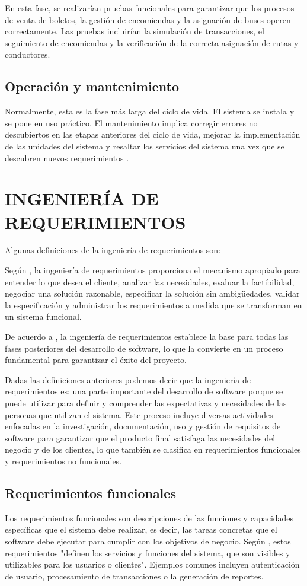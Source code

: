 		En esta fase, se realizarían pruebas funcionales para garantizar que los procesos de venta de boletos, la gestión de encomiendas y la asignación de buses operen correctamente. Las pruebas incluirían la simulación de transacciones, el seguimiento de encomiendas y la verificación de la correcta asignación de rutas y conductores.
	\subsection{Operación y mantenimiento}
		Normalmente, esta es la fase más larga del ciclo de vida. El sistema se instala y se pone en uso práctico. El mantenimiento implica corregir errores no descubiertos en las etapas anteriores del ciclo de vida, mejorar la implementación de las unidades del sistema y resaltar los servicios del sistema una vez que se descubren nuevos requerimientos \parencite{sommerville2011introduccion}.
	\section{INGENIERÍA DE REQUERIMIENTOS}
		
		Algunas definiciones de la ingeniería de requerimientos son:
		
		Según \textcite{pressman2010ingenieria}, la ingeniería de requerimientos proporciona el mecanismo apropiado para entender lo que desea el cliente, analizar las necesidades, evaluar la factibilidad, negociar una solución razonable, especificar la solución sin ambigüedades, validar la especificación y administrar los requerimientos a medida que se transforman en un sistema funcional.
		
		De acuerdo a \textcite{sommerville2011introduccion}, la ingeniería de requerimientos establece la base para todas las fases posteriores del desarrollo de software, lo que la convierte en un proceso fundamental para garantizar el éxito del proyecto.
		
		Dadas las definiciones anteriores podemos decir que la ingeniería de requerimientos es: una parte importante del desarrollo de software porque se puede utilizar para definir y comprender las expectativas y necesidades de las personas que utilizan el sistema. Este proceso incluye diversas actividades enfocadas en la investigación, documentación, uso y gestión de requisitos de software para garantizar que el producto final satisfaga las necesidades del negocio y de los clientes, lo que también se clasifica en requerimientos funcionales y requerimientos no funcionales.
	\subsection{Requerimientos funcionales}
		Los requerimientos funcionales son descripciones de las funciones y capacidades específicas que el sistema debe realizar, es decir, las tareas concretas que el software debe ejecutar para cumplir con los objetivos de negocio. Según \textcite{sommerville2011introduccion}, estos requerimientos "definen los servicios y funciones del sistema, que son visibles y utilizables para los usuarios o clientes". Ejemplos comunes incluyen autenticación de usuario, procesamiento de transacciones o la generación de reportes.
